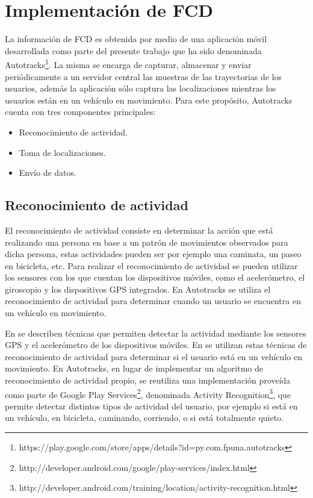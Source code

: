 \section{Implementación de FCD}
\label{floating-car-data}

La información de FCD es obtenida por medio de una aplicación móvil desarrollada como parte del presente trabajo que ha sido denominada Autotracks\footnote{https://play.google.com/store/apps/details?id=py.com.fpuna.autotracks}. La misma se encarga de capturar, almacenar y enviar periódicamente a un servidor central las muestras de las trayectorias de los usuarios, además la aplicación sólo captura las localizaciones mientras los usuarios están en un vehículo en movimiento. Para este propósito, Autotracks cuenta con tres componentes principales: 
\begin{itemize}
	\item Reconocimiento de actividad.
	\item Toma de localizaciones.
	\item Envío de datos.
\end{itemize}

\subsection{Reconocimiento de actividad}
\label{reconocimiento_actividad}

El reconocimiento de actividad consiste en determinar la acción que está realizando una persona en base a un patrón de movimientos observados para dicha persona, estas actividades pueden ser por ejemplo una caminata, un paseo en bicicleta, etc. Para realizar el reconocimiento de actividad se pueden utilizar los sensores con los que cuentan los dispositivos móviles, como el acelerómetro, el giroscopio y los dispositivos GPS integrados. En Autotracks se utiliza el reconocimiento de actividad para determinar cuando un usuario se encuentra en un vehículo en movimiento.

En \citep{liao2006location,bao2004activity,ravi2005activity} se describen técnicas que permiten detectar la actividad mediante los sensores GPS y el acelerómetro de los dispositivos móviles. En \citep{thiagarajan2010cooperative} se utilizan estas técnicas de reconocimiento de actividad para determinar si el usuario está en un vehículo en movimiento. En Autotracks, en lugar de implementar un algoritmo de reconocimiento de actividad propio, se reutiliza una implementación proveída como parte de Google Play Services\footnote{http://developer.android.com/google/play-services/index.html}, denominada Activity Recognition\footnote{http://developer.android.com/training/location/activity-recognition.html}, que permite detectar distintos tipos de actividad del usuario, por ejemplo si está en un vehículo, en bicicleta, caminando, corriendo, o si está totalmente quieto.

